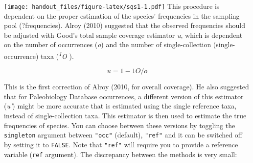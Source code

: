 \documentclass[]{article}
\begin{document}
\texttt{[image: handout\_files/figure-latex/sqs1-1.pdf]} This procedure
is dependent on the proper estimation of the species' frequencies in the
sampling pool (?frequencies). Alroy (2010) suggested that the observed
frequencies should be adjusted with Good's total sample coverage
estimator \emph{u}, which is dependent on the number of occurrences
(\emph{o}) and the number of single-collection (single-occurrence) taxa
(\emph{\textsuperscript{1}O }).

\[u = 1 - {1}O/o\]

This is the first correction of Alroy (2010, for overall coverage). He
also suggested that for Paleobiology Database occurrences, a different
version of this estimator (\emph{u'}) might be more accurate that is
estimated using the single reference taxa, instead of single-collection
taxa. This estimator is then used to estimate the true frequencies of
species. You can choose between these versions by toggling the
\texttt{singleton} argument between \texttt{"occ"} (default),
\texttt{"ref"} and it can be switched off by setting it to
\texttt{FALSE}. Note that \texttt{"ref"} will require you to provide a
reference variable (\texttt{ref} argument). The discrepancy between the
methods is very small:
\end{document}
